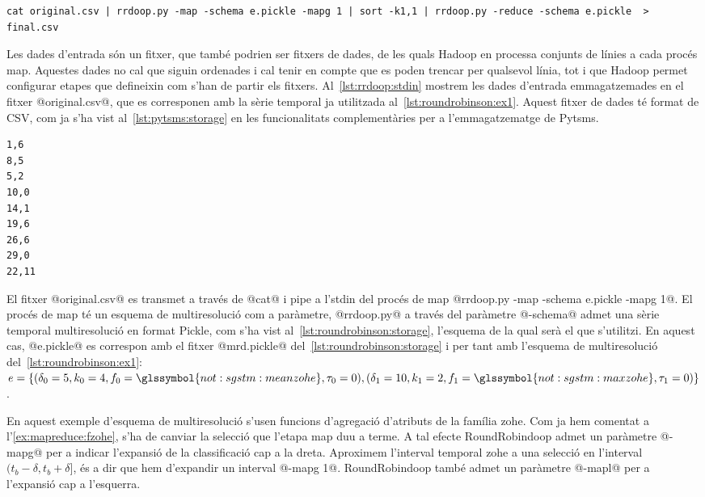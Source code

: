 \begin{lstlisting}[style=sh,caption=Execució a la shell de
  rrdoop.py,label=lst:rrdoop:shell]
cat original.csv | rrdoop.py -map -schema e.pickle -mapg 1 | sort -k1,1 | rrdoop.py -reduce -schema e.pickle  > final.csv
\end{lstlisting}


Les dades d'entrada són un fitxer, que també podrien ser fitxers de
dades, de les quals Hadoop en processa conjunts de línies a cada
procés map. Aquestes dades no cal que siguin ordenades i cal tenir en
compte que es poden trencar per qualsevol línia, tot i que Hadoop
permet configurar etapes que defineixin com s'han de partir els
fitxers.  Al~\autoref{lst:rrdoop:stdin} mostrem les dades d'entrada
emmagatzemades en el fitxer @original.csv@, que es corresponen
amb la sèrie temporal ja utilitzada
al~\autoref{lst:roundrobinson:ex1}.  Aquest fitxer de dades té format
de \gls{CSV}, com ja s'ha vist al~\autoref{lst:pytsms:storage} en les
funcionalitats complementàries per a l'emmagatzematge de Pytsms.
\begin{lstlisting}[style=file,caption=Dades d'entrada original.csv,label=lst:rrdoop:stdin]
1,6
8,5
5,2
10,0
14,1
19,6
26,6
29,0
22,11
\end{lstlisting}


El fitxer @original.csv@ es transmet a través de @cat@ i pipe a
l'stdin del procés de map %
@rrdoop.py -map -schema e.pickle -mapg 1@.  El procés de map té un esquema de
multiresolució com a paràmetre, @rrdoop.py@ a través del paràmetre
@-schema@ admet una sèrie temporal multiresolució en format Pickle,
com s'ha vist al~\autoref{lst:roundrobinson:storage}, l'esquema de la
qual serà el que s'utilitzi. En aquest cas, @e.pickle@ es correspon
amb el fitxer @mrd.pickle@ del~\autoref{lst:roundrobinson:storage} i
per tant amb l'esquema de multiresolució
del~\autoref{lst:roundrobinson:ex1}:
$e=\{(\delta_0=5,k_0=4,f_0=\glssymbol{not:sgstm:meanzohe},\tau_0=0),(\delta_1=10,k_1=2,f_1=\glssymbol{not:sgstm:maxzohe},\tau_1=0)\}$.


En aquest exemple d'esquema de multiresolució s'usen funcions
d'agregació d'atributs de la família \gls{zohe}. Com ja hem comentat a
l'\autoref{ex:mapreduce:fzohe}, s'ha de canviar la selecció que
l'etapa map duu a terme. A tal efecte RoundRobindoop admet un
paràmetre @-mapg@ per a indicar l'expansió de la classificació cap a
la dreta. Aproximem l'interval temporal \gls{zohe} a una selecció en
l'interval $(t_b-\delta,t_b+\delta]$, és a dir que hem d'expandir un
interval @-mapg 1@.  RoundRobindoop també admet un paràmetre @-mapl@
per a l'expansió cap a l'esquerra.


